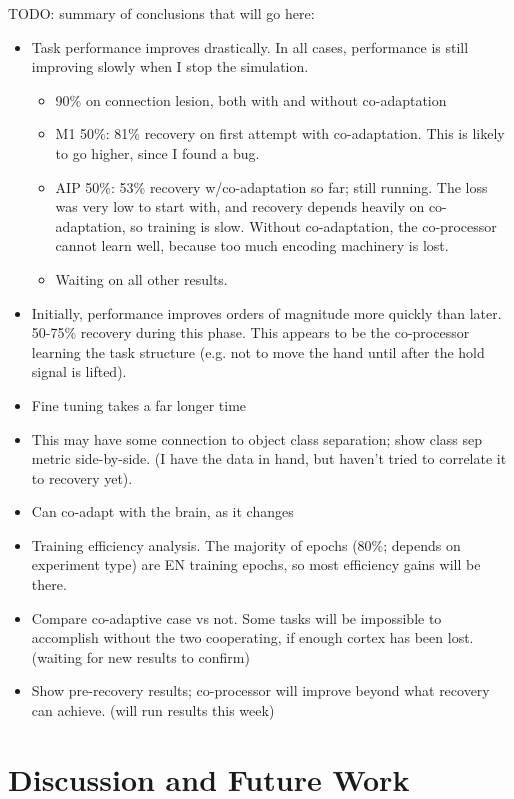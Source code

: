 \documentclass[12pt]{iopart}
\begin{document}
TODO: summary of conclusions that will go here:
\begin{itemize}
	\item Task performance improves drastically. In all cases, performance is still improving slowly when I stop the simulation.
		\begin{itemize}
			\item 90\% on connection lesion, both with and without co-adaptation
			\item M1 50\%: 81\% recovery on first attempt with co-adaptation. This is likely to go higher, since I found a bug.
			\item AIP 50\%: 53\% recovery w/co-adaptation so far; still running. The loss was very low to start with, and recovery depends heavily on co-adaptation, so training is slow. Without co-adaptation, the co-processor cannot learn well, because too much encoding machinery is lost.
			\item Waiting on all other results.
		\end{itemize}
	\item Initially, performance improves orders of magnitude more quickly than later. 50-75\% recovery during this phase. This appears to be the co-processor learning the task structure (e.g. not to move the hand until after the hold signal is lifted).
	\item Fine tuning takes a far longer time
	\item This may have some connection to object class separation; show class sep metric side-by-side. (I have the data in hand, but haven't tried to correlate it to recovery yet).
	\item Can co-adapt with the brain, as it changes
	\item Training efficiency analysis. The majority of epochs (80\%; depends on experiment type) are EN training epochs, so most efficiency gains will be there.
	\item Compare co-adaptive case vs not. Some tasks will be impossible to accomplish without the two cooperating, if enough cortex has been lost. (waiting for new results to confirm)
	\item Show pre-recovery results; co-processor will improve beyond what recovery can achieve. (will run results this week)
\end{itemize}

\section{Discussion and Future Work}
\label{sec:discussion}
\end{document}
